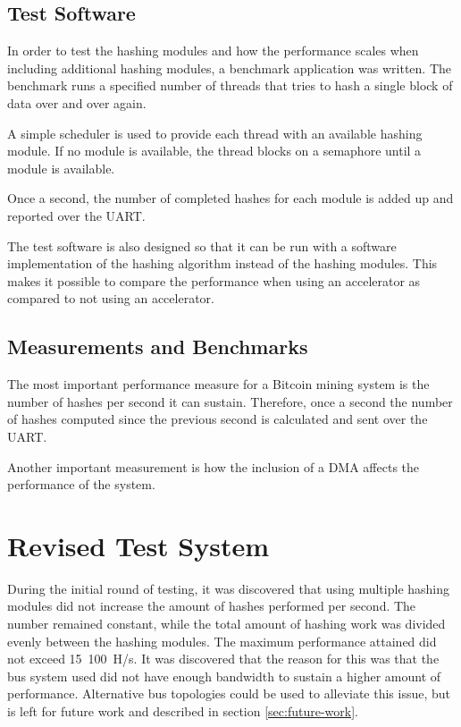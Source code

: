 \subsection{Test Software}
In order to test the hashing modules and how the performance scales when including
additional hashing modules, a benchmark application was written. The benchmark
runs a specified number of threads that tries to hash a single block of data
over and over again.

A simple scheduler is used to provide each thread with an available hashing module.
If no module is available, the thread blocks on a semaphore until a module is available.

Once a second, the number of completed hashes for each module is added up and
reported over the UART.

The test software is also designed so that it can be run with a software implementation
of the hashing algorithm instead of the hashing modules. This makes it possible
to compare the performance when using an accelerator as compared to not using
an accelerator.

\subsection{Measurements and Benchmarks}
The most important performance measure for a Bitcoin mining system is the number
of hashes per second it can sustain. Therefore, once a second the number of hashes
computed since the previous second is calculated and sent over the UART.

Another important measurement is how the inclusion of a DMA affects the performance
of the system.

\section{Revised Test System}

During the initial round of testing, it was discovered that using multiple hashing
modules did not increase the amount of hashes performed per second. The number remained
constant, while the total amount of hashing work was divided evenly between
the hashing modules. The maximum performance attained did not exceed 15~100~H/s.
It was discovered that the reason for this was that the bus system used did not have
enough bandwidth to sustain a higher amount of performance. Alternative bus topologies
could be used to alleviate this issue, but is left for future work and described in
section \ref{sec:future-work}.

